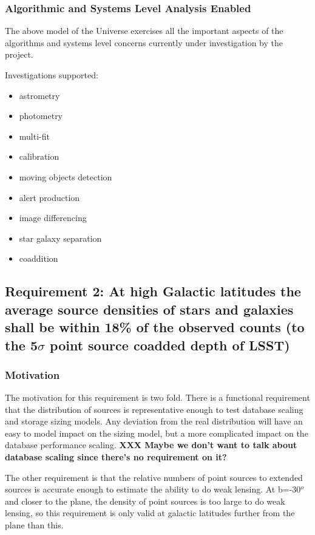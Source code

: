 \documentclass[]{article}
\begin{document}
\subsubsection{Algorithmic and Systems Level Analysis Enabled}
The above model of the Universe exercises all the important aspects of the algorithms and systems level concerns currently under investigation
by the project.

Investigations supported:
\begin{itemize}
\item astrometry
\item photometry
\item multi-fit
\item calibration
\item moving objects detection
\item alert production
\item image differencing
\item star galaxy separation
\item coaddition
\end{itemize}

\subsection{Requirement 2: At high Galactic latitudes the average source densities of stars and galaxies
shall be within 18\% of the observed counts (to the 5$\sigma$ point source coadded depth of LSST)}
\subsubsection{Motivation}
The motivation for this requirement is two fold.  There is a functional requirement that the distribution of sources is representative
enough to test database scaling and storage sizing models.  Any deviation from the real distribution will have an easy to model impact 
on the sizing model, but a more complicated impact on the database performance scaling. {\bf XXX Maybe we don't want to talk about 
database scaling since there's no requirement on it?}

The other requirement is that the relative numbers of point sources to extended sources is accurate enough to estimate the ability
to do weak lensing.  At b=-30$^o$ and closer to the plane, the density of point sources is too large to do weak lensing, so this
requirement is only valid at galactic latitudes further from the plane than this.
\end{document}
